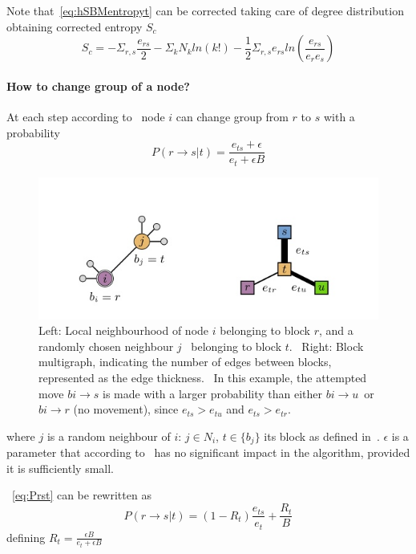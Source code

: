 Note that~\ref{eq:hSBMentropyt} can be corrected taking care of degree
distribution obtaining corrected entropy $S_c$
\begin{equation}
  S_c=-\Sigma_{r,s}\frac{e_{rs}}{2}-\Sigma_k
  N_kln(k!)-\frac{1}{2}\Sigma_{r,s}e_{rs}ln\left(\frac{e_{rs}}{e_re_s}\right)
\end{equation}

\paragraph{How to change group of a node?}
At each step according to~\cite{peixoto2014efficient} node $i$ can change group from $r$ to $s$ with a probability
\begin{equation}\label{eq:Prst}
  P(r\to s|t)=\frac{e_{ts}+\epsilon}{e_t+\epsilon B}
\end{equation}

\begin{figure}[htb!]
  \centering
  \includegraphics[width=0.9\linewidth]{pictures/topic/topic_pixioto_move.jpg}
  \caption{Left: Local neighbourhood of node $i$ belonging to block $r$, and a randomly chosen neighbour $j$ \
  belonging to block $t$. \
  Right: Block multigraph, indicating the number of edges between blocks, represented as the edge thickness. \
  In this example, the attempted move $bi \to s$ is made with a larger probability than either $bi \to u$\
   or $bi \to r$ (no movement), since $e_{ts}>e_{tu}$ and $e_{ts}>e_{tr}$.}
  \label{fig:topic_pixioto_move}
\end{figure}

where $j$ is a random neighbour of $i$: $j\in N_i$, $t\in\{b_j\}$ its block as defined in~\cite{peixoto2014efficient}.
$\epsilon$ is a parameter that according to~\cite{peixoto2017nonparametric} has no significant impact in the algorithm,
provided it is sufficiently small.

~\ref{eq:Prst} can be rewritten as \[P(r\to s|t)=(1-R_t)\frac{e_{ts}}{e_t}+\frac{R_t}{B}\]
defining $R_t=\frac{\epsilon B}{e_t + \epsilon B}$

